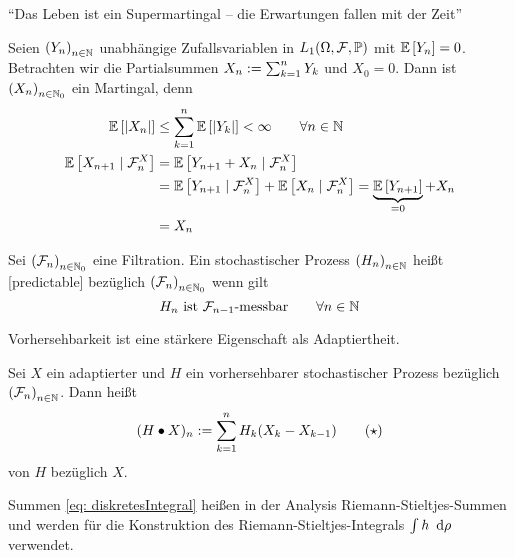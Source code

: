 \enquote{Das Leben ist ein Supermartingal -- die Erwartungen fallen mit der Zeit} \smiley

\begin{beispiel}
	Seien $\left( Y_n \right)_{n \in \mathbb{N}}$ unabhängige Zufallsvariablen in $L_1(\Omega,\mathcal{F},\mathbb{P})$ mit $\mathbb{E} \left[ Y_n \right] = 0$. Betrachten wir die Partialsummen $X_n \mathrel{:=} \sum_{k=1}^n Y_k$ und $X_0 = 0$. Dann ist $\left( X_n \right)_{n \in \mathbb{N}_0}$ ein Martingal, denn
		\begin{equation*}
			\begin{aligned}
			\mathbb{E} \left[ \left| X_n \right| \right] &\le \sum_{k=1}^n \mathbb{E} \left[ \left| Y_k \right| \right] < \infty \qquad \forall n \in \mathbb{N} \\
			\mathbb{E} \left[ X_{n+1} \mid \mathcal{F}_n^X \right] &= \mathbb{E} \left[ Y_{n+1} + X_n \mid \mathcal{F}_n^X \right] \\
			&= \mathbb{E} \left[ Y_{n+1} \mid \mathcal{F}_n^X \right] + \mathbb{E} \left[ X_n \mid \mathcal{F}_n^X \right] = \underbrace{\mathbb{E} \left[ Y_{n+1} \right]}_{=0} + X_n \\
			&= X_n
			\end{aligned}
		\end{equation*}
\end{beispiel}

\begin{*definition}
	Sei $\left( \mathcal{F}_n \right)_{n \in \mathbb{N}_0}$ eine Filtration. Ein stochastischer Prozess $\left( H_n \right)_{n \in \mathbb{N}}$ heißt  [predictable] bezüglich $\left( \mathcal{F}_n \right)_{n \in \mathbb{N}_0}$ wenn gilt
	\begin{equation*}
		H_n \text{ ist } \mathcal{F}_{n-1} \text{-messbar} \qquad \forall n \in \mathbb{N}
	\end{equation*}
\end{*definition}

\begin{*bemerkung}
	Vorhersehbarkeit ist eine stärkere Eigenschaft als Adaptiertheit.
\end{*bemerkung}

\begin{*definition}
	Sei $X$ ein adaptierter und $H$ ein vorhersehbarer stochastischer Prozess bezüglich $\left( \mathcal{F}_n \right)_{n \in \mathbb{N}}$. Dann heißt 
	\begin{equation}
		(H \bullet X)_n \mathrel{:=} \sum_{k=1}^n H_k (X_k - X_{k-1}) \tag{$\star$} \label{eq: diskretesIntegral}
	\end{equation}
	 von $H$ bezüglich $X$.
\end{*definition}

\begin{*bemerkung}
	Summen \eqref{eq: diskretesIntegral} heißen in der Analysis Riemann-Stieltjes-Summen und werden für die Konstruktion des Riemann-Stieltjes-Integrals $\int h \enskip \mathrm{d}\rho$ verwendet.
\end{*bemerkung}

